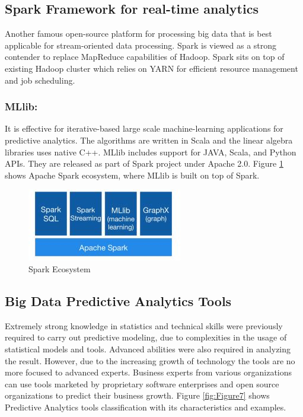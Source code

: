 \documentclass[runningheads]{llncs}
\begin{document}
\subsection{Spark Framework for real-time analytics}
Another famous open-source platform for processing big data that is best applicable for stream-oriented data processing. Spark is viewed as a strong contender to replace MapReduce capabilities of Hadoop. Spark sits on top of existing Hadoop cluster which relies on YARN for efficient resource management and job scheduling. 
\subsubsection{MLlib:}It is effective for iterative-based large scale machine-learning applications for predictive analytics. The algorithms are written in Scala and the linear algebra libraries uses native C++. MLlib includes support for JAVA, Scala, and Python APIs. They are released as part of Spark project under Apache 2.0. Figure \ref{fig:Figure6} shows Apache Spark ecosystem, where MLlib is built on top of Spark.
\begin{figure}[htbp]
	\centering
	\vspace{0.85cm}
	\hspace*{-0.45cm}
	
	\includegraphics[scale=0.7]{Figure7.jpg}
	\caption{Spark Ecosystem}
	\label{fig:Figure6}
	\vspace{-0.5em}
\end{figure}

\subsection{Big Data Predictive Analytics Tools}
Extremely strong knowledge in statistics and technical skills were previously required to carry out predictive modeling, due to complexities in the usage of statistical models and tools. Advanced abilities were also required in analyzing the result. However, due to the increasing growth of technology the tools are no more focused to advanced experts. Business experts from various organizations can use tools marketed by proprietary software enterprises and open source organizations to predict their business growth.
Figure \ref{fig:Figure7} \cite{14} shows Predictive Analytics tools classification with its characteristics and examples.
\end{document}
